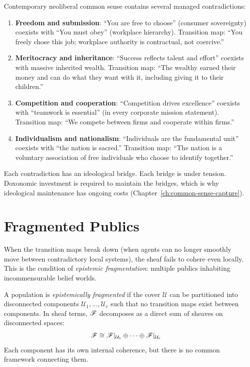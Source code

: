 \begin{example}
\label{ex:neoliberal-contradictions}
Contemporary neoliberal common sense contains several managed contradictions:
\begin{enumerate}[nosep]
  \item \textbf{Freedom and submission}: ``You are free to choose'' (consumer sovereignty) coexists with ``You must obey'' (workplace hierarchy).
  Transition map: ``You freely chose this job; workplace authority is contractual, not coercive.''
  \item \textbf{Meritocracy and inheritance}: ``Success reflects talent and effort'' coexists with massive inherited wealth.
  Transition map: ``The wealthy earned their money and can do what they want with it, including giving it to their children.''
  \item \textbf{Competition and cooperation}: ``Competition drives excellence'' coexists with ``teamwork is essential'' (in every corporate mission statement).
  Transition map: ``We compete between firms and cooperate within firms.''
  \item \textbf{Individualism and nationalism}: ``Individuals are the fundamental unit'' coexists with ``the nation is sacred.''
  Transition map: ``The nation is a voluntary association of free individuals who choose to identify together.''
\end{enumerate}
Each contradiction has an ideological bridge.
Each bridge is under tension.
Doxonomic investment is required to maintain the bridges, which is why ideological maintenance has ongoing costs (Chapter~\ref{ch:common-sense-capture}).
\end{example}


\section{Fragmented Publics}
\label{sec:ch12-fragmentation}

When the transition maps break down (when agents can no longer smoothly move between contradictory local systems), the sheaf fails to cohere even locally.
This is the condition of \emph{epistemic fragmentation}: multiple publics inhabiting incommensurable belief worlds.

\begin{definition}
\label{def:fragmentation}
A population is \emph{epistemically fragmented} if the cover $\mathcal{U}$ can be partitioned into disconnected components $\mathcal{U}_1, \ldots, \mathcal{U}_r$ such that no transition maps exist between components.
In sheaf terms, $\mathscr{F}$ decomposes as a direct sum of sheaves on disconnected spaces:
\[
  \mathscr{F} \cong \mathscr{F}|_{\mathcal{U}_1} \oplus \cdots \oplus \mathscr{F}|_{\mathcal{U}_r}
\]
Each component has its own internal coherence, but there is no common framework connecting them.
\end{definition}

